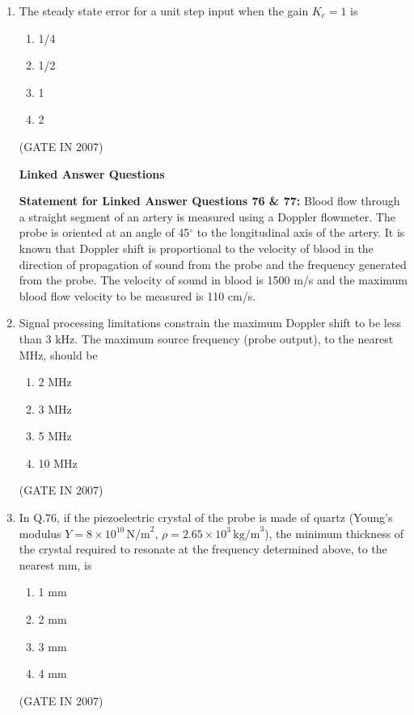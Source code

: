 \documentclass[journal]{IEEEtran}
\begin{document}
\begin{enumerate}
\item 
The steady state error for a unit step input when the gain $K_c = 1$ is  

\begin{multicols}{4}
\begin{enumerate}
\item 1/4  
\item 1/2  
\item 1  
\item 2  
\end{enumerate}
\end{multicols}
\hfill(GATE IN 2007)

\begin{center}
    \textbf{Linked Answer Questions}
\end{center}
\textbf{Statement for Linked Answer Questions 76 \& 77:}  
Blood flow through a straight segment of an artery is measured using a Doppler flowmeter. The probe is oriented at an angle of 45$^\circ$ to the longitudinal axis of the artery. It is known that Doppler shift is proportional to the velocity of blood in the direction of propagation of sound from the probe and the frequency generated from the probe. The velocity of sound in blood is 1500 m/s and the maximum blood flow velocity to be measured is 110 cm/s.  

\item 
Signal processing limitations constrain the maximum Doppler shift to be less than 3 kHz. The maximum source frequency (probe output), to the nearest MHz, should be  

\begin{multicols}{4}
\begin{enumerate}
\item 2 MHz  
\item 3 MHz  
\item 5 MHz  
\item 10 MHz  
\end{enumerate}
\end{multicols}
\hfill(GATE IN 2007)

\item 
In Q.76, if the piezoelectric crystal of the probe is made of quartz (Young's modulus $Y=8\times10^{10}\,\text{N/m}^2$, $\rho = 2.65\times10^3\,\text{kg/m}^3$), the minimum thickness of the crystal required to resonate at the frequency determined above, to the nearest mm, is  

\begin{multicols}{4}
\begin{enumerate}
\item 1 mm  
\item 2 mm  
\item 3 mm  
\item 4 mm  
\end{enumerate}
\end{multicols}
\hfill(GATE IN 2007)


\end{enumerate}
\end{document}

